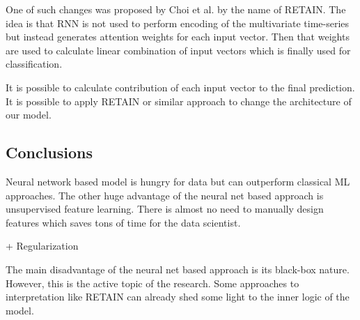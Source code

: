 \documentclass{sigkddExp}
\begin{document}
One of such changes was proposed by Choi et al.\cite{DBLP:journals/corr/ChoiBSSS16} by the name of RETAIN. The idea is that RNN is not used to perform encoding of the multivariate time-series but instead generates attention weights for each input vector. Then that weights are used to calculate linear combination of input vectors which is finally used for classification.

It is possible to calculate contribution of each input vector to the final prediction. It is possible to apply RETAIN or similar approach to change the architecture of our model.

\subsection{Conclusions}

Neural network based model is hungry for data but can outperform classical ML approaches. The other huge advantage of the neural net based approach is unsupervised feature learning. There is almost no need to manually design features which saves tons of time for the data scientist.

+ Regularization 

The main disadvantage of the neural net based approach is its black-box nature. However, this is the active topic of the research. Some approaches to interpretation like RETAIN can already shed some light to the inner logic of the model.



\end{document}
